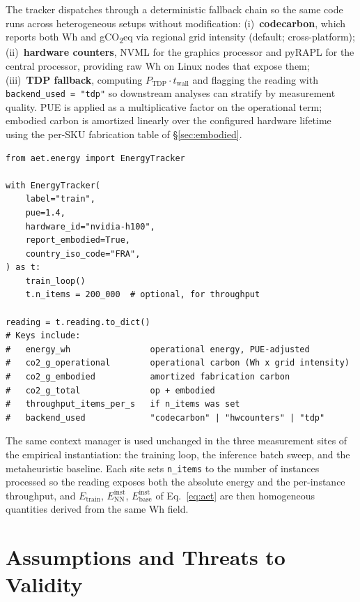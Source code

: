 \documentclass[11pt]{article}
\begin{document}
The tracker dispatches through a deterministic fallback chain so the
same code runs across heterogeneous setups without modification:
(i)~\textbf{codecarbon}, which reports both Wh and gCO\textsubscript{2}eq via
regional grid intensity (default; cross-platform);
(ii)~\textbf{hardware counters}, NVML for the graphics processor and pyRAPL for
the central processor, providing raw Wh on Linux nodes that expose
them; (iii)~\textbf{TDP fallback}, computing
\(P_\text{TDP} \cdot t_\text{wall}\) and flagging the reading with
\texttt{backend\_used = "tdp"} so downstream analyses can stratify by
measurement quality. PUE is applied as a multiplicative factor on the
operational term; embodied carbon is amortized linearly over the
configured hardware lifetime using the per-SKU fabrication table of
\S\ref{sec:embodied}.

\begin{lstlisting}[style=aetpython,float=!htb,floatplacement=!htb,caption={Typical use of the energy tracker around a training loop.},label={lst:tracker}]
from aet.energy import EnergyTracker

with EnergyTracker(
    label="train",
    pue=1.4,
    hardware_id="nvidia-h100",
    report_embodied=True,
    country_iso_code="FRA",
) as t:
    train_loop()
    t.n_items = 200_000  # optional, for throughput

reading = t.reading.to_dict()
# Keys include:
#   energy_wh                operational energy, PUE-adjusted
#   co2_g_operational        operational carbon (Wh x grid intensity)
#   co2_g_embodied           amortized fabrication carbon
#   co2_g_total              op + embodied
#   throughput_items_per_s   if n_items was set
#   backend_used             "codecarbon" | "hwcounters" | "tdp"
\end{lstlisting}

The same context manager is used unchanged in the three measurement
sites of the empirical instantiation: the training loop, the
inference batch sweep, and the metaheuristic baseline. Each site sets
\texttt{n\_items} to the number of instances processed so the reading
exposes both the absolute energy and the per-instance throughput, and
\(E_\text{train}\), \(E_\text{NN}^\text{inst}\),
\(E_\text{base}^\text{inst}\) of Eq.~\eqref{eq:aet} are then
homogeneous quantities derived from the same Wh field.

\section{Assumptions and Threats to Validity}
\label{sec:threats}
\end{document}
